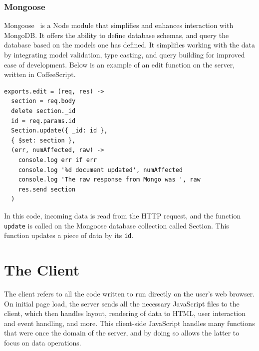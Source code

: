 \documentclass[12pt]{article}
\newcommand{\code}[1]{{\texttt {#1}}}
\begin{document}
\subsubsection{Mongoose}\label{sec:mongoose}
Mongoose~\cite{Mongoose} is a Node module that simplifies and enhances interaction with MongoDB. It offers the ability to define database schemas, and query the database based on the models one has defined. It simplifies working with the data by integrating model validation, type casting, and query building for improved ease of development. Below is an example of an edit function on the server, written in CoffeeScript.
\begin{verbatim}
exports.edit = (req, res) ->
  section = req.body
  delete section._id
  id = req.params.id
  Section.update({ _id: id },
  { $set: section },
  (err, numAffected, raw) ->
    console.log err if err
    console.log '%d document updated', numAffected
    console.log 'The raw response from Mongo was ', raw
    res.send section
  )
\end{verbatim}
In this code, incoming data is read from the HTTP request, and the function \code{update} is called on the Mongoose database collection called Section. This function updates a piece of data by its \code{id}.


\section{The Client}\label{sec:client}
The client refers to all the code written to run directly on the user's web browser. On initial page load, the server sends all the necessary JavaScript files to the client, which then handles layout, rendering of data to HTML, user interaction and event handling, and more. This client-side JavaScript handles many functions that were once the domain of the server, and by doing so allows the latter to focus on data operations.
\end{document}
